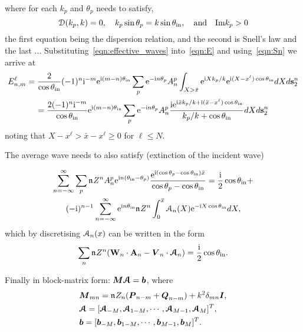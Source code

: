\documentclass[12pt, a4paper]{article}
\begin{document}
where for each $k_p$ and $\theta_p$ needs to satisfy,
\begin{equation}
  \mathcal D(k_p,k) =0, \quad  k_p \sin \theta_p = k \sin \theta_{\mathrm{in}}, \quad \text{and} \quad \text{Im}  k_p > 0
\end{equation}
the first equation being the dispersion relation, and the second is Snell's law and the last ... Substituting~\eqref{eqn:effective_waves} into~\eqref{eqn:E} and using~\eqref{eqn:Sn} we arrive at
\begin{multline}
  E_{n,m}^\ell  = \frac{2}{\cos \theta_{\mathrm{in}}} (-1)^n \textrm{i}^{-m} \textrm{e}^{\textrm{i} (m-n) \theta_{\mathrm{in}}}
   \sum_p \textrm{e}^{-\textrm{i} n \theta_p} A_{n}^p \int_{X>\bar x} \textrm{e}^{\textrm{i} X k_p/k}
  \textrm{e}^{\textrm{i} (X-x^\ell) \cos \theta_{\mathrm{in}} }
   dX  d\mathbf s_2^n
   \\
   = \frac{2 (-1)^n \textrm{i}^{-m} }{\cos \theta_{\mathrm{in}}} \textrm{e}^{\textrm{i} (m-n) \theta_{\mathrm{in}}}
    \sum_p \textrm{e}^{-\textrm{i} n \theta_p} A_{n}^p
    \frac{\textrm{i} \textrm{e}^{\textrm{i} \bar x k_p/k + \textrm{i} (\bar x - x^\ell) \cos \theta_{\mathrm{in}}}}{k_p/k + \cos \theta_{\mathrm{in}}}
    dX  d\mathbf s_2^n
\end{multline}
noting that $ X -x^\ell > \bar x - x^\ell \geq 0 $ for $\ell \leq N$.




The average wave needs to also satisfy (extinction of the incident wave)

\begin{multline}
  \sum_{n=-\infty}^\infty \sum_{p} \mathfrak n_{} Z^n  A_n^p \textrm{e}^{\textrm{i} n(\theta_{\mathrm{in}}-\theta_p)}  \frac{\textrm{e}^{\textrm{i} (\cos \theta_p-\cos \theta_{\mathrm{in}}){\bar x}}}{\cos \theta_p-\cos \theta_{\mathrm{in}}}
 = \frac{\textrm{i} }{2} \cos \theta_{\mathrm{in}} +
 \\
   (-\textrm{i})^{n-1} \sum_{n=-\infty}^\infty \textrm{e}^{\textrm{i} n \theta_{\mathrm{in}}} \mathfrak n_{} Z^n
  \int_{0}^{{\bar x}} \mathcal A_n(X)  \textrm{e}^{-\textrm{i} X \cos \theta_{\mathrm{in}} }d X,
\end{multline}
which by discretising $\mathcal A_n(x)$ can be written in the form
\begin{equation}
\sum_n  \mathfrak n_{ } Z^n ( \mathbf W_n \cdot \mathbf A_n - \boldsymbol{V}_n \cdot \boldsymbol{\mathcal A}_n )  = \frac{\textrm{i} }{2} \cos \theta_{\mathrm{in}}.
\end{equation}





Finally in block-matrix form: $\boldsymbol{M} \boldsymbol{\mathcal A}  =  \boldsymbol{b}$, where
\begin{align}
&\boldsymbol{M}_{mn} = \mathfrak n_{} Z_n ( \boldsymbol{P}_{n-m} + \boldsymbol{Q}_{n-m})+  k^2 \delta_{mn} \boldsymbol{I},
\\
& \boldsymbol{\mathcal A} = [ \boldsymbol{\mathcal A}_{-M}, \boldsymbol{\mathcal A}_{1-M}, \cdots, \boldsymbol{\mathcal A}_{M-1}, \boldsymbol{\mathcal A}_{M}]^T,
\\
& \boldsymbol{b} = [ \boldsymbol{b}_{-M}, \boldsymbol{b}_{1-M}, \cdots, \boldsymbol{b}_{M-1}, \boldsymbol{b}_{M}]^T.
  \label{eqn:ensemAsystemB}
\end{align}
\end{document}
